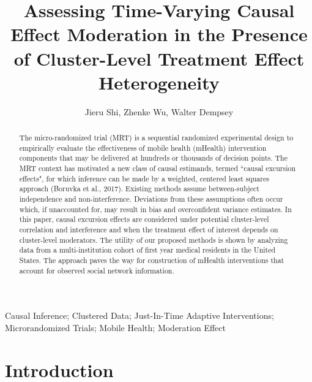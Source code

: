 \documentclass[12pt]{article}
\begin{document}
\title{Assessing Time-Varying Causal Effect Moderation in the Presence of Cluster-Level Treatment Effect Heterogeneity}
\author{Jieru Shi, Zhenke Wu, Walter Dempsey}
\maketitle
\begin{abstract}\noindent

The micro-randomized trial (MRT) is a sequential randomized experimental design to empirically evaluate the effectiveness of mobile health (mHealth) intervention components that may be delivered at hundreds or thousands of decision points. The MRT context has motivated a new class of causal estimands, termed ``causal excursion effects", for which inference can be made by a weighted, centered least squares approach (Boruvka et al., 2017). Existing methods assume between-subject independence and non-interference. Deviations from these assumptions often occur which, if unaccounted for, may result in bias and overconfident variance estimates. In this paper, causal excursion effects are considered under potential cluster-level correlation and interference and when the treatment effect of interest depends on cluster-level moderators. The utility of our proposed methods is shown by analyzing data from a multi-institution cohort of first year medical residents in the United States. The approach paves the way for construction of mHealth interventions that account for observed social network information.
\end{abstract}

 Causal Inference; Clustered Data; Just-In-Time Adaptive Interventions; Microrandomized Trials; Mobile Health; Moderation Effect

\section{Introduction}
\end{document}
